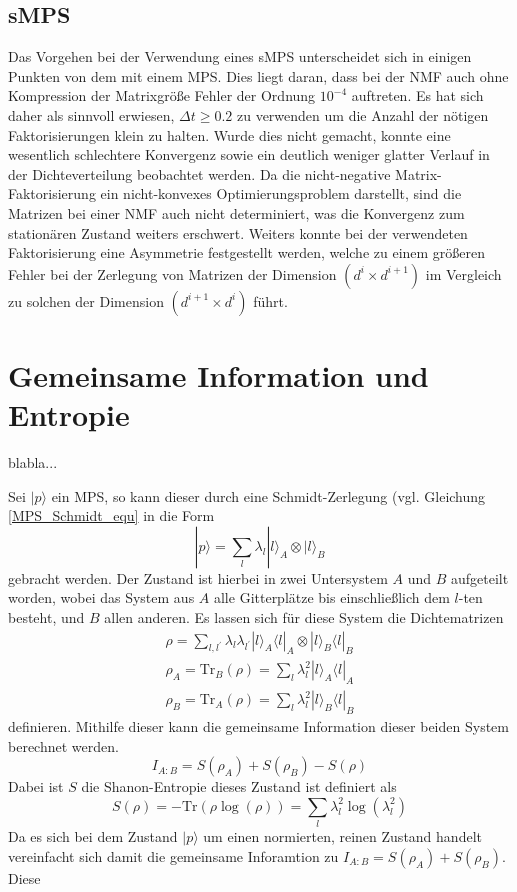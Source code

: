 \documentclass[10pt,a4paper]{report}
\begin{document}
\subsection{sMPS}

Das Vorgehen bei der Verwendung eines sMPS unterscheidet sich in einigen Punkten von dem mit einem MPS. Dies liegt daran, dass bei der NMF auch ohne Kompression der Matrixgröße Fehler der Ordnung $10^{-4}$ auftreten. Es hat sich daher als sinnvoll erwiesen, $\Delta t\geq 0.2$ zu verwenden um die Anzahl der nötigen Faktorisierungen klein zu halten. Wurde dies nicht gemacht, konnte eine wesentlich schlechtere Konvergenz sowie ein deutlich weniger glatter Verlauf in der Dichteverteilung beobachtet werden. Da die nicht-negative Matrix-Faktorisierung ein nicht-konvexes Optimierungsproblem darstellt, sind die Matrizen bei einer NMF auch nicht determiniert, was die Konvergenz zum stationären Zustand weiters erschwert. Weiters konnte bei der verwendeten Faktorisierung eine Asymmetrie festgestellt werden, welche zu einem größeren Fehler bei der Zerlegung von Matrizen der Dimension $(d^i\times d^{i+1})$ im Vergleich zu solchen der Dimension $(d^{i+1}\times d^i)$ führt.



\section{Gemeinsame Information und Entropie}\label{information_entropy}
blabla...

Sei $|p\rangle$ ein MPS, so kann dieser durch eine Schmidt-Zerlegung (vgl. Gleichung \ref{MPS_Schmidt_equ} in die Form 
\begin{equation}
|p\rangle=\sum_{l}\lambda_{l}|l\rangle_A\otimes|l\rangle_B
\end{equation}
gebracht werden. Der Zustand ist hierbei in zwei Untersystem $A$ und $B$ aufgeteilt worden, wobei das System aus $A$ alle Gitterplätze bis einschließlich dem $l$-ten besteht, und $B$ allen anderen. Es lassen sich für diese System die Dichtematrizen
\begin{equation}
\begin{split}
\rho=\sum_{l,l^{\prime}}\lambda_l\lambda_{l^{\prime}}|l\rangle_A\langle l|_A\otimes |l\rangle_B\langle l|_B\\
\rho_A=\text{Tr}_B(\rho)=\sum_{l}\lambda_l^2|l\rangle_A\langle l|_A\\
\rho_B=\text{Tr}_A(\rho)=\sum_{l}\lambda_l^2|l\rangle_B\langle l|_B
\end{split}
\end{equation}
definieren. Mithilfe dieser kann die gemeinsame Information dieser beiden System berechnet werden. 
\begin{equation}
I_{A:B}=S(\rho_A)+S(\rho_B)-S(\rho)
\end{equation}
Dabei ist $S$ die Shanon-Entropie dieses Zustand ist definiert als
\begin{equation}
S(\rho)=-\text{Tr}(\rho\log(\rho))=\sum_l\lambda_l^2\log(\lambda_l^2)
\end{equation} 
Da es sich bei dem Zustand $|p\rangle$ um einen normierten, reinen Zustand handelt vereinfacht sich damit die gemeinsame Inforamtion zu $I_{A:B}=S(\rho_A)+S(\rho_B)$. Diese
\end{document}
